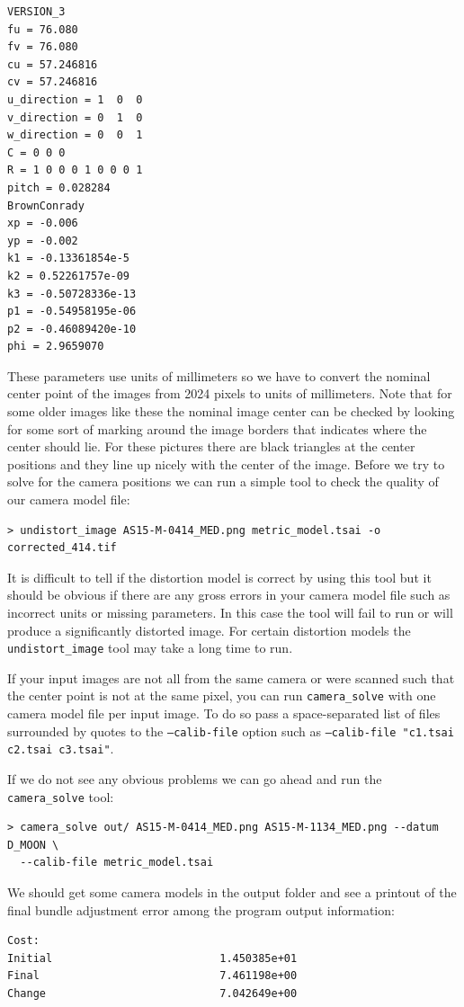 \begin{verbatim}
VERSION_3
fu = 76.080
fv = 76.080
cu = 57.246816
cv = 57.246816
u_direction = 1  0  0
v_direction = 0  1  0
w_direction = 0  0  1
C = 0 0 0
R = 1 0 0 0 1 0 0 0 1
pitch = 0.028284
BrownConrady
xp = -0.006
yp = -0.002
k1 = -0.13361854e-5
k2 = 0.52261757e-09
k3 = -0.50728336e-13
p1 = -0.54958195e-06
p2 = -0.46089420e-10
phi = 2.9659070
\end{verbatim}

These parameters use units of millimeters so we have to convert the nominal center
point of the images from 2024 pixels to units of millimeters.  Note that for some older
images like these the nominal image center can be checked by looking for some sort of
marking around the image borders that indicates where the center should lie.  For these
pictures there are black triangles at the center positions and they line up nicely
with the center of the image.  Before we try to solve for the camera positions we can run
a simple tool to check the quality of our camera model file:
\begin{verbatim}
> undistort_image AS15-M-0414_MED.png metric_model.tsai -o corrected_414.tif
\end{verbatim}

It is difficult to tell if the distortion model is correct by using this
tool but it should be obvious if there are any gross errors in your
camera model file such as incorrect units or missing parameters.  In this
case the tool will fail to run or will produce a significantly distorted image.
For certain distortion models the \texttt{undistort\_image} tool may take a long time to run.

If your input images are not all from the same camera or were scanned such that the center
point is not at the same pixel, you can run \texttt{camera\_solve} with one camera
model file per input image.  To do so pass a space-separated list of files 
surrounded by quotes to the \texttt{--calib-file} option such as 
\texttt{--calib-file "c1.tsai c2.tsai c3.tsai"}.

If we do not see any obvious problems we can go ahead and run the \texttt{camera\_solve} tool:
\begin{verbatim}
> camera_solve out/ AS15-M-0414_MED.png AS15-M-1134_MED.png --datum D_MOON \
  --calib-file metric_model.tsai
\end{verbatim}

We should get some camera models in the output folder and see a printout of
the final bundle adjustment error among the program output information:
\begin{verbatim}
Cost:
Initial                          1.450385e+01
Final                            7.461198e+00
Change                           7.042649e+00
\end{verbatim}

